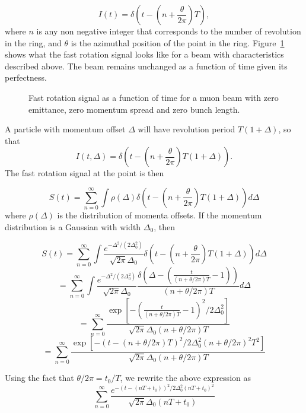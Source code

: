 \begin{equation}
I(t)=\delta\left(t-\left(n+\frac{\theta}{2\pi}\right)T\right),
\end{equation} 
where $n$ is any non negative integer that corresponds to the number of revolution in the ring, 
and $\theta$ is the azimuthal position of the point in the ring.
Figure~\ref{fig:perfect_frs} shows what the fast rotation signal looks like for a beam with characteristics described above.
The beam remains unchanged as a function of time given its perfectness.

\begin{figure}[bt]

\caption{Fast rotation signal as a function of time for a muon beam with zero emittance, zero momentum spread and zero bunch length.}
\label{fig:perfect_frs}
\end{figure}
 
A particle with momentum offset $\Delta$ will have revolution period $T(1+\Delta)$, so that 
\begin{equation}
I(t,\Delta)=\delta\left(t-\left(n+\frac{\theta}{2\pi}\right)T\left(1+\Delta\right)\right). 
\end{equation}
The fast rotation signal at the point is then 

\begin{equation}
S(t)=\sum^{\infty}_{n=0}\int\rho(\Delta)\delta\left(t-\left(n+\frac{\theta}{2\pi}\right)T\left(1+\Delta\right)\right)d\Delta 
\end{equation}
where $\rho(\Delta)$ is the distribution of momenta offsets. If the momentum distribution is a Gaussian with width $\Delta_0$, then 

\[S(t) =\sum^{\infty}_{n=0}\int\frac{e^{-\Delta^2/(2\Delta^2_0)}}{\sqrt{2\pi}\Delta_0}
\delta\left(t-\left(n+\frac{\theta}{2\pi}\right)T\left(1+\Delta\right)\right)d\Delta\]
\[=\sum^{\infty}_{n=0}\int\frac{e^{-\Delta^2/(2\Delta^2_0)}}{\sqrt{2\pi}\Delta_0}\frac{\delta\left(\Delta-\left(\frac{t}{(n+\theta/2\pi)T}-1\right)\right)}{(n+\theta/2\pi)T}d\Delta\]
\[=\sum^{\infty}_{n=0}\frac{\exp[-(\frac{t}{(n+\theta/2\pi)T}-1)^2/2\Delta^2_0]}{\sqrt{2\pi}\Delta_0(n+\theta/2\pi)T}\]
\[=\sum^{\infty}_{n=0}\frac{\exp[-(t-(n+\theta/2\pi)T)^2/2\Delta^2_0(n+\theta/2\pi)^2T^2]}{\sqrt{2\pi}\Delta_0(n+\theta/2\pi)T}\]

Using the fact that $\theta/2\pi=t_0/T$, we rewrite the above expression as 
\begin{equation}
\sum^{\infty}_{n=0}\frac{e^{-(t-(nT+t_0))^2/2\Delta^2_0(nT+t_0)^2}}{\sqrt{2\pi}\Delta_0(nT+t_0)}
\label{eq:Espread_frs}
\end{equation}


